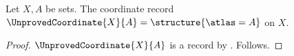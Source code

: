 

\begin{construction}\label{unproved_coordinate_bound}
    Let $X,A$ be sets.
    The coordinate record $\UnprovedCoordinate{X}{A}=
        \structure{\atlas=A}$ on $X$.
\end{construction}
\begin{proof}
    $\UnprovedCoordinate{X}{A}$ is a record
        by .
    Follows.
\end{proof}
